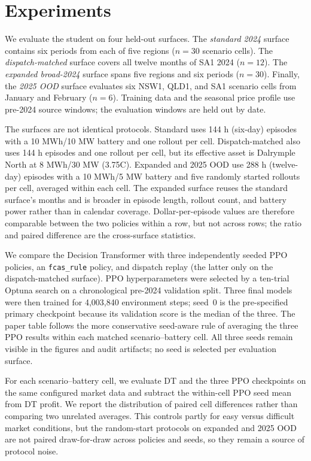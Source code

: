 \documentclass{article}
\begin{document}
\section{Experiments}
\label{sec:experiments}
We evaluate the student on four held-out surfaces. The \emph{standard 2024}
surface contains six periods from each of five regions ($n=30$ scenario
cells). The \emph{dispatch-matched} surface covers all twelve months of
SA1 2024 ($n=12$). The \emph{expanded broad-2024} surface spans five
regions and six periods ($n=30$). Finally, the \emph{2025 OOD} surface
evaluates six NSW1, QLD1, and SA1 scenario cells from January and February
($n=6$). Training data and the seasonal price profile use pre-2024 source
windows; the evaluation windows are held out by date.

The surfaces are not identical protocols. Standard uses 144 h (six-day)
episodes with a 10 MWh/10 MW battery and one rollout per cell. Dispatch-matched
also uses 144 h episodes and one rollout per cell, but its effective asset is
Dalrymple North at 8 MWh/30 MW (3.75C). Expanded and 2025 OOD use 288 h
(twelve-day) episodes with a 10 MWh/5 MW battery and five randomly started
rollouts per cell, averaged within each cell.
The expanded surface reuses the standard surface's months and is broader in
episode length, rollout count, and battery power rather than in calendar
coverage. Dollar-per-episode values are therefore comparable between the two
policies within a row, but not across rows; the ratio and paired difference are
the cross-surface statistics.

We compare the Decision Transformer with three independently seeded PPO
policies, an \texttt{fcas\_rule} policy, and dispatch replay (the latter only on
the dispatch-matched surface). PPO hyperparameters were selected by a ten-trial
Optuna search on a chronological pre-2024 validation split. Three final models
were then trained for 4{,}003{,}840 environment steps; seed~0 is the
pre-specified primary checkpoint because its validation score is the median of
the three. The paper table follows the more conservative seed-aware rule of
averaging the three PPO results within each matched scenario--battery cell.
All three seeds remain visible in the figures and audit artifacts; no seed is
selected per evaluation surface.

For each scenario--battery cell, we evaluate DT and the three PPO checkpoints on
the same configured market data and subtract the within-cell PPO seed mean from
DT profit. We report the distribution of paired cell differences rather than
comparing two unrelated averages. This controls partly for easy versus difficult
market conditions, but the random-start protocols on expanded and 2025 OOD are
not paired draw-for-draw across policies and seeds, so they remain a source of
protocol noise.
\end{document}

